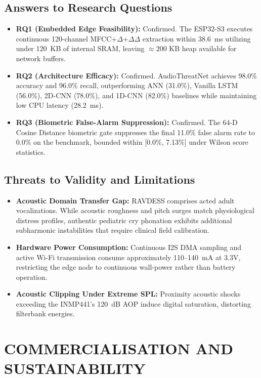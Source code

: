 \documentclass[12pt, a4paper]{report}
\begin{document}
\section{Answers to Research Questions}
\begin{itemize}
    \item \textbf{RQ1 (Embedded Edge Feasibility):} Confirmed. The ESP32-S3 executes continuous 120-channel MFCC+$\Delta$+$\Delta\Delta$ extraction within 38.6~ms utilizing under 120~KB of internal SRAM, leaving $\approx 200\text{ KB}$ heap available for network buffers.
    \item \textbf{RQ2 (Architecture Efficacy):} Confirmed. AudioThreatNet achieves 98.0\% accuracy and 96.0\% recall, outperforming ANN (31.0\%), Vanilla LSTM (56.0\%), 2D-CNN (78.0\%), and 1D-CNN (82.0\%) baselines while maintaining low CPU latency (28.2~ms).
    \item \textbf{RQ3 (Biometric False-Alarm Suppression):} Confirmed. The 64-D Cosine Distance biometric gate suppresses the final 11.0\% false alarm rate to 0.0\% on the benchmark, bounded within [0.0\%, 7.13\%] under Wilson score statistics.
\end{itemize}

\section{Threats to Validity and Limitations}
\begin{itemize}
    \item \textbf{Acoustic Domain Transfer Gap:} RAVDESS comprises acted adult vocalizations. While acoustic roughness and pitch surges match physiological distress profiles, authentic pediatric cry phonation exhibits additional subharmonic instabilities that require clinical field calibration.
    \item \textbf{Hardware Power Consumption:} Continuous I2S DMA sampling and active Wi-Fi transmission consume approximately 110--140~mA at 3.3V, restricting the edge node to continuous wall-power rather than battery operation.
    \item \textbf{Acoustic Clipping Under Extreme SPL:} Proximity acoustic shocks exceeding the INMP441's 120~dB AOP induce digital saturation, distorting filterbank energies.
\end{itemize}

\chapter{COMMERCIALISATION AND SUSTAINABILITY}
\end{document}
